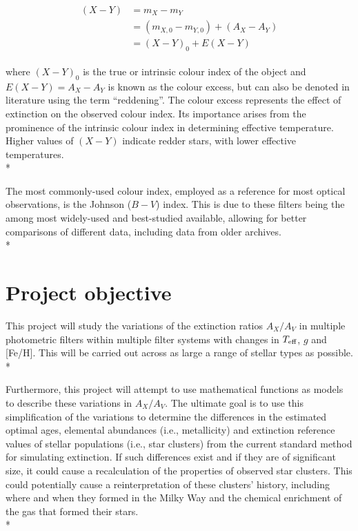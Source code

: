 \documentclass[12pt, a4paper]{report}
\begin{document}
\begin{align}
\begin{split}
(X-Y) &= m_{X} - m_{Y} \\
 &= (m_{X,0} - m_{Y,0}) + (A_{X} - A_{Y}) \\
 &= (X-Y)_{0} + E(X-Y)
\end{split}
\end{align}

where $(X-Y)_{0}$ is the true or intrinsic colour index of the object and $E(X-Y) = A_{X} - A_{Y}$ is known as the colour excess, but can also be denoted in literature using the term ``reddening''. The colour excess represents the effect of extinction on the observed colour index. Its importance arises from the prominence of the intrinsic colour index in determining effective temperature. Higher values of $(X-Y)$ indicate redder stars, with lower effective temperatures.\\*

The most commonly-used colour index, employed as a reference for most optical observations, is the Johnson ($B-V$) index. This is due to these filters being the among most widely-used and best-studied available, allowing for better comparisons of different data, including data from older archives.\\*

\section{Project objective}
This project will study the variations of the extinction ratios $A_{X}/A_{V}$ in multiple photometric filters within multiple filter systems with changes in $T_{\textnormal{eff}}$, $g$ and [Fe/H]. This will be carried out across as large a range of stellar types as possible.\\*

Furthermore, this project will attempt to use mathematical functions as models to describe these variations in $A_{X}/A_{V}$. The ultimate goal is to use this simplification of the variations to determine the differences in the estimated optimal ages, elemental abundances (i.e., metallicity) and extinction reference values of stellar populations (i.e., star clusters) from the current standard method for simulating extinction. If such differences exist and if they are of significant size, it could cause a recalculation of the properties of observed star clusters. This could potentially cause a reinterpretation of these clusters' history, including where and when they formed in the Milky Way and the chemical enrichment of the gas that formed their stars. \\*
\end{document}
